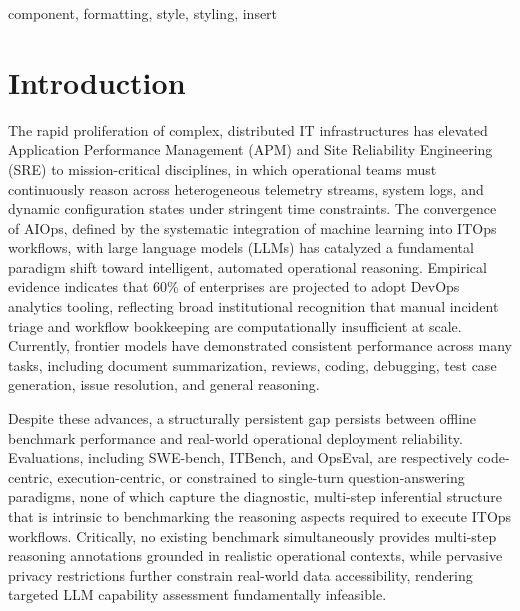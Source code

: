 \documentclass[conference]{IEEEtran}
\begin{document}
\begin{IEEEkeywords}
component, formatting, style, styling, insert
\end{IEEEkeywords}

\section{Introduction}\label{sec1}


The rapid proliferation of complex, distributed IT infrastructures has elevated Application Performance Management (APM) and Site Reliability Engineering (SRE) to mission-critical disciplines, in which operational teams must continuously reason across heterogeneous telemetry streams, system logs, and dynamic configuration states under stringent time constraints. The convergence of AIOps, defined by the systematic integration of machine learning into ITOps workflows, with large language models (LLMs) has catalyzed a fundamental paradigm shift toward intelligent, automated operational reasoning. Empirical evidence indicates that 60\% of enterprises are projected to adopt DevOps analytics tooling, reflecting broad institutional recognition that manual incident triage and workflow bookkeeping are computationally insufficient at scale. Currently, frontier models have demonstrated consistent performance across many tasks, including document summarization, reviews, coding, debugging, test case generation, issue resolution, and general reasoning. 

Despite these advances, a structurally persistent gap persists between offline benchmark performance and real-world operational deployment reliability. Evaluations, including SWE-bench, ITBench, and OpsEval, are respectively code-centric, execution-centric, or constrained to single-turn question-answering paradigms, none of which capture the diagnostic, multi-step inferential structure that is intrinsic to benchmarking the reasoning aspects required to execute ITOps workflows. Critically, no existing benchmark simultaneously provides multi-step reasoning annotations grounded in realistic operational contexts, while pervasive privacy restrictions further constrain real-world data accessibility, rendering targeted LLM capability assessment fundamentally infeasible.
\end{document}
